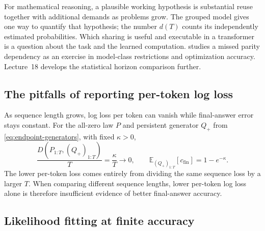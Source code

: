 \documentclass[11pt,twoside]{article}
\newcommand{\E}{\mathbb E}
\newcommand{\KL}{D}
\theoremstyle{definition}
\theoremstyle{remark}
\begin{document}
For mathematical reasoning, a plausible working hypothesis is
substantial reuse together with additional demands as problems grow.
The grouped model gives one way to quantify that hypothesis; the
number \(d(T)\) counts its independently estimated probabilities.
Which sharing is useful and executable in a transformer is a question
about the task and the learned computation.
 studies a missed parity dependency as an
exercise in model-class restrictions and optimization accuracy.
Lecture~18 develops the statistical horizon comparison further.

\subsection{The pitfalls of reporting per-token log loss}
\label{sec:late-predictions}

As sequence length grows, log loss per token can vanish while
final-answer error stays constant. For the all-zero law \(P\) and
persistent generator \(Q_+\) from \cref{eq:endpoint-generators},
with fixed \(\kappa>0\),
\begin{equation}
 \frac{\KL(P_{1:T},(Q_+)_{1:T})}{T}
 =\frac{\kappa}{T}\longrightarrow0,
 \qquad
 \E_{(Q_+)_{1:T}}[c_{\mathrm{fin}}]=1-e^{-\kappa}.
 \label{eq:endpoint-normalization}
\end{equation}
The lower per-token loss comes entirely from dividing the same
sequence loss by a larger \(T\).
When comparing different sequence lengths, lower per-token log loss
alone is therefore insufficient evidence of better final-answer accuracy.

\subsection{Likelihood fitting at finite accuracy}
\label{sec:likelihood-pitfall}
\end{document}
